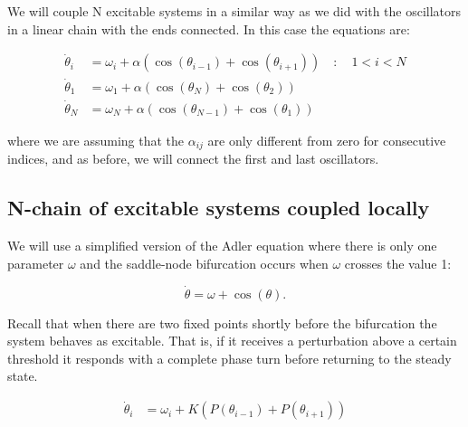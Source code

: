 \documentclass{article}
\begin{document}
We will couple N excitable systems in a similar way as we did with the oscillators in a linear chain with the ends connected. In this case the equations are:

\begin{subequations} \label{eq_Nexcoupled}
\begin{align} 
    \dot{\theta}_i &= \omega_i + \alpha \left(\cos(\theta_{i-1})+\cos(\theta_{i+1})\right)  \quad : \quad 1<i<N \\
    \dot{\theta}_1 &= \omega_1 + \alpha \left(\cos(\theta_{N})+\cos(\theta_{2})\right) \\
    \dot{\theta}_N &= \omega_N + \alpha \left(\cos(\theta_{N-1})+\cos(\theta_{1})\right) 
\end{align}
\end{subequations}

where we are assuming that the $\alpha_{ij}$ are only different from zero for consecutive indices, and
as before, we will connect the first and last oscillators.

\begin{figure} [h]
    \centerline{}
    \caption{}
    \label{fig_noscmodulated}
\end{figure}

\newpage

\subsection{N-chain of excitable systems coupled locally}


We will use a simplified version of the Adler equation where there is only one parameter $\omega$ and the saddle-node bifurcation occurs when $\omega$ crosses the value 1:

\begin{equation} \label{eq_adlers}
    \dot{\theta} = \omega + \cos(\theta).
\end{equation}

Recall that when there are two fixed points shortly before the bifurcation the system behaves as excitable. That is, if it receives a perturbation above a certain threshold it responds with a complete phase turn before returning to the steady state. 


\begin{subequations} \label{eq_Nexcoupled}
\begin{align} 
    \dot{\theta}_i &= \omega_i + K \left(P(\theta_{i-1})+P(\theta_{i+1})\right)  
\end{align}
\end{subequations}
\end{document}
